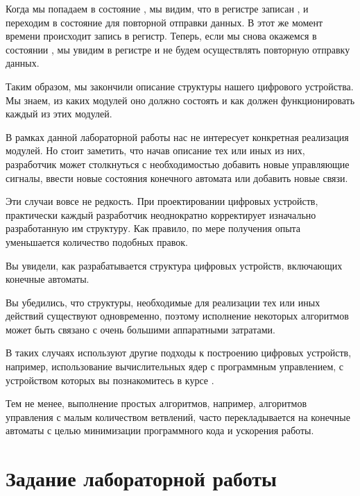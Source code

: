 \par{Когда мы попадаем в состояние , мы видим, что в регистре записан , и переходим в состояние  для повторной отправки данных. В этот же момент времени происходит запись  в регистр. Теперь, если мы снова окажемся в состоянии , мы увидим в регистре  и не будем осуществлять повторную отправку данных. }

\par{Таким образом, мы закончили описание структуры нашего цифрового устройства. Мы знаем, из каких модулей оно должно состоять и как должен функционировать каждый из этих модулей.}

\par{В рамках данной лабораторной работы нас не интересует конкретная реализация модулей. Но стоит заметить, что начав описание тех или иных из них, разработчик может столкнуться с необходимостью добавить новые управляющие сигналы, ввести новые состояния конечного автомата или добавить новые связи.}

\par{Эти случаи вовсе не редкость. При проектировании цифровых устройств, практически каждый разработчик неоднократно корректирует изначально разработанную им структуру. Как правило, по мере получения опыта уменьшается количество подобных правок.}

\par{Вы увидели, как разрабатывается структура цифровых устройств, включающих конечные автоматы.}

\par{Вы убедились, что структуры, необходимые для реализации тех или иных действий существуют одновременно, поэтому исполнение некоторых алгоритмов может быть связано с очень большими аппаратными затратами.}

\par{В таких случаях используют другие подходы к построению цифровых устройств, например, использование вычислительных ядер с программным управлением, с устройством которых вы познакомитесь в курсе .}

\par{Тем не менее, выполнение простых алгоритмов, например, алгоритмов управления с малым количеством ветвлений, часто перекладывается на конечные автоматы с целью минимизации программного кода и ускорения работы.}

\section{Задание лабораторной работы}

